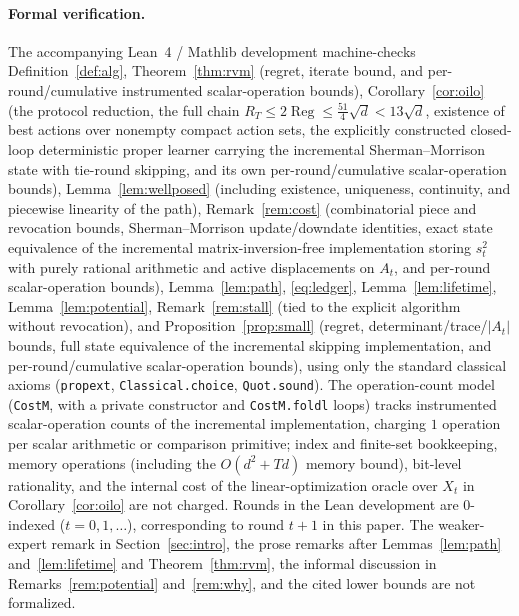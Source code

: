 \documentclass[11pt]{article}
\theoremstyle{plain}
\theoremstyle{definition}
\theoremstyle{remark}
\DeclareMathOperator{\Reg}{Reg}
\begin{document}
\paragraph{Formal verification.} The accompanying Lean~4 / Mathlib development machine-checks
Definition~\ref{def:alg}, Theorem~\ref{thm:rvm} (regret, iterate bound, and per-round/cumulative
instrumented scalar-operation bounds), Corollary~\ref{cor:oilo} (the protocol reduction, the full
chain $R_T\le2\Reg\le\tfrac{51}{4}\sqrt d<13\sqrt d$, existence of best actions over nonempty
compact action sets, the explicitly constructed closed-loop deterministic proper learner carrying
the incremental Sherman--Morrison state with tie-round skipping, and its own per-round/cumulative
scalar-operation bounds), Lemma~\ref{lem:wellposed} (including existence, uniqueness, continuity,
and piecewise linearity of the path), Remark~\ref{rem:cost} (combinatorial piece and revocation
bounds, Sherman--Morrison update/downdate identities, exact state equivalence of the incremental
matrix-inversion-free implementation storing $s_t^2$ with purely rational arithmetic and active
displacements on $A_t$, and per-round scalar-operation bounds), Lemma~\ref{lem:path},
\eqref{eq:ledger}, Lemma~\ref{lem:lifetime}, Lemma~\ref{lem:potential}, Remark~\ref{rem:stall}
(tied to the explicit algorithm without revocation), and Proposition~\ref{prop:small} (regret,
determinant/trace/$|A_t|$ bounds, full state equivalence of the incremental skipping
implementation, and per-round/cumulative scalar-operation bounds), using only the standard
classical axioms (\texttt{propext}, \texttt{Classical.choice}, \texttt{Quot.sound}). The
operation-count model (\texttt{CostM}, with a private constructor and \texttt{CostM.foldl} loops)
tracks instrumented scalar-operation counts of the incremental implementation, charging $1$
operation per scalar arithmetic or comparison primitive; index and finite-set bookkeeping, memory
operations (including the $O(d^2+Td)$ memory bound), bit-level rationality, and the internal cost
of the linear-optimization oracle over $X_t$ in Corollary~\ref{cor:oilo} are not charged. Rounds in
the Lean development are $0$-indexed ($t=0,1,\dots$), corresponding to round $t+1$ in this paper.
The weaker-expert remark in Section~\ref{sec:intro}, the prose remarks after Lemmas~\ref{lem:path}
and~\ref{lem:lifetime} and Theorem~\ref{thm:rvm}, the informal discussion in
Remarks~\ref{rem:potential} and~\ref{rem:why}, and the cited lower bounds are not formalized.
\end{document}
